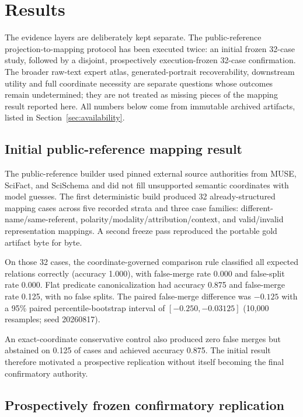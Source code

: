 \section{Results}
\label{sec:results}

The evidence layers are deliberately kept separate. The public-reference
projection-to-mapping protocol has been executed twice: an initial frozen
32-case study, followed by a disjoint, prospectively execution-frozen 32-case
confirmation. The broader raw-text expert atlas, generated-portrait
recoverability, downstream utility and full coordinate necessity are separate
questions whose outcomes remain undetermined; they are not treated as missing
pieces of the mapping result reported here. All numbers below come from
immutable archived artifacts, listed in Section~\ref{sec:availability}.

\subsection{Initial public-reference mapping result}

The public-reference builder used pinned external source authorities from
MUSE, SciFact, and SciSchema and did not fill unsupported semantic coordinates
with model guesses. The first deterministic build produced 32
already-structured mapping cases across five recorded strata and three case
families: different-name/same-referent, polarity/modality/attribution/context,
and valid/invalid representation mappings. A second freeze pass reproduced the
portable gold artifact byte for byte.

On those 32 cases, the coordinate-governed comparison rule classified all
expected relations correctly (accuracy 1.000), with false-merge rate 0.000 and
false-split rate 0.000. Flat predicate canonicalization had accuracy 0.875 and
false-merge rate 0.125, with no false splits. The paired false-merge
difference was $-0.125$ with a 95\% paired percentile-bootstrap interval of
$[-0.250,-0.03125]$ (10,000 resamples; seed 20260817).

An exact-coordinate conservative control also produced zero false merges but
abstained on 0.125 of cases and achieved accuracy 0.875. The initial result
therefore motivated a prospective replication without itself becoming the
final confirmatory authority.

\subsection{Prospectively frozen confirmatory replication}

